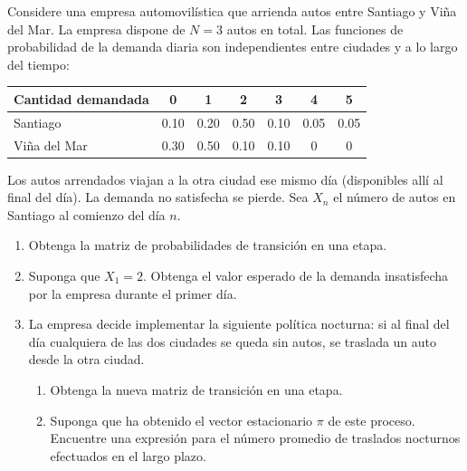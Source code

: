 \documentclass[10pt,a4paper]{article}
\newenvironment{enunciado}[1]{%
  \begin{tcolorbox}[
    breakable,
    colback=sectionbg!8, colframe=sectionbg,
    boxrule=0.8pt, arc=3pt, left=8pt, right=8pt, top=6pt, bottom=6pt,
    fonttitle=\normalsize\bfseries\sffamily, coltitle=white, colbacktitle=sectionbg, titlerule=0pt,
    title={#1},
  ]%
}{\end{tcolorbox}}
\begin{document}
\begin{enunciado}{P35 \textperiodcentered\ Empresa de arriendo de autos: Santiago--Vi\~na del Mar}
  Considere una empresa automovilística que arrienda autos entre Santiago y Vi\~na del
  Mar. La empresa dispone de $N=3$ autos en total. Las funciones de probabilidad de
  la demanda diaria son independientes entre ciudades y a lo largo del tiempo:

  \smallskip
  \begin{center}
    \begin{tabular}{lcccccc}
      \toprule
      Cantidad demandada & 0    & 1    & 2    & 3    & 4    & 5    \\
      \midrule
      Santiago           & 0.10 & 0.20 & 0.50 & 0.10 & 0.05 & 0.05 \\
      Vi\~na del Mar     & 0.30 & 0.50 & 0.10 & 0.10 & 0    & 0    \\
      \bottomrule
    \end{tabular}
  \end{center}

  \smallskip
  Los autos arrendados viajan a la otra ciudad ese mismo d\'ia (disponibles allí al
  final del d\'ia). La demanda no satisfecha se pierde. Sea $X_n$ el n\'umero de autos
  en Santiago al comienzo del d\'ia $n$.

  \smallskip
  \begin{enumerate}[label=\alph*)]
    \item Obtenga la matriz de probabilidades de transici\'on en una etapa.
    \item Suponga que $X_1=2$. Obtenga el valor esperado de la demanda insatisfecha
          por la empresa durante el primer d\'ia.
    \item La empresa decide implementar la siguiente pol\'itica nocturna: si al final
          del d\'ia cualquiera de las dos ciudades se queda sin autos, se traslada un
          auto desde la otra ciudad.
          \begin{enumerate}[label=\roman*.]
            \item Obtenga la nueva matriz de transici\'on en una etapa.
            \item Suponga que ha obtenido el vector estacionario $\pi$ de este proceso.
                  Encuentre una expresi\'on para el n\'umero promedio de traslados nocturnos
                  efectuados en el largo plazo.
          \end{enumerate}
  \end{enumerate}
\end{enunciado}
\end{document}
